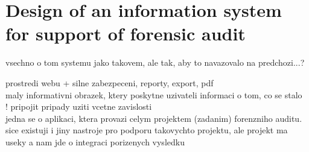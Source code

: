 \newcommand{\komentar}[1]{{\leavevmode\color[rgb]{1.0, 0.13, 0.32}#1}}
\newcommand{\sediva}[1]{{\leavevmode\color[rgb]{0.5, 0.5, 0.5}#1}}
\newcommand{\dotaz}[1]{{\leavevmode\color[rgb]{0.0, 0.5, 1.0}DOTAZ: #1\\}}
\newcommand{\anglictina}[1]{{\colorbox{green}{[AJ!] \leavevmode\color[rgb]{0.0, 0.0, 0.0}#1 }}}


\setcounter{chapter}{0}
\setcounter{section}{1}

 














\chapter{Design of an information system for support of forensic audit}
\komentar{
vsechno o tom systemu jako takovem, ale tak, aby to navazovalo na predchozi...?

prostredi webu + silne zabezpeceni, reporty, export, pdf\\
maly informativni obrazek, ktery poskytne uzivateli informaci o tom, co se stalo\\
! pripojit pripady uziti vcetne zavislosti\\

jedna se o aplikaci, ktera provazi celym projektem (zadanim) forenzniho auditu. sice existuji i jiny nastroje pro podporu takovychto projektu, ale projekt ma useky a nam jde o integraci porizenych vysledku

}




